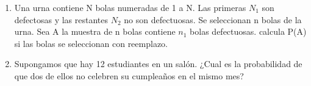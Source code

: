 \documentclass[12pt,a4paper]{report}
\begin{document}
\begin{enumerate}
  \item{
	Una urna contiene N  bolas numeradas de 1 a N. Las primeras $N_{1}$ son defectosas y las restantes $N_{2}$ no son defectuosas. Se seleccionan n bolas de la urna. Sea A la muestra de n bolas contiene $n_{1}$ bolas defectuosas. calcula P(A) si las bolas se seleccionan con reemplazo.
  }

  \item{
	Supongamos que hay 12 estudiantes en un salón. ¿Cual es la probabilidad de que dos de ellos no celebren su cumpleaños en el mismo mes?
  }





\end{enumerate}
\end{document}
